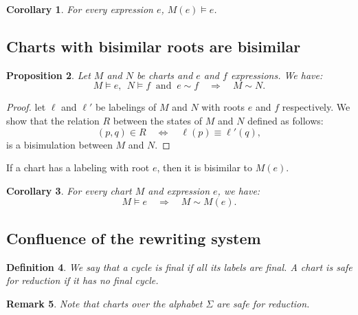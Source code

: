 \documentclass{article}
\newtheorem{definition}{Definition}[section]
\newtheorem{proposition}[definition]{Proposition}
\newtheorem{corollary}[definition]{Corollary}
\newtheorem{remark}[definition]{Remark}
\begin{document}
\begin{corollary} For every expression $e$, $M(e)\models e$.~\label{prop:milner-chart-is-decorable}
~\label{prop:Milner-is-decorable}\end{corollary}

\subsection{Charts with bisimilar roots are bisimilar}

\begin{proposition} Let $M$ and $N$ be charts and $e$ and $f$ expressions. We have:
  $$ M\models e,\ \ N\models f \ \text{ and }\ e\sim f \quad \Longrightarrow\quad M\sim N.$$
\end{proposition}
\begin{proof} let $\ell$ and $\ell'$ be labelings of $M$ and $N$ with roots $e$ and $f$ respectively.  We show that the relation $R$ between the states of $M$ and $N$ defined as follows:
  $$ (p,q)\in R \quad \Leftrightarrow \quad \ell(p) \equiv \ell'(q), $$
  is a bisimulation between $M$ and $N$.
\end{proof}
If a chart has a labeling with root $e$, then it is bisimilar to $M(e)$.
\begin{corollary} For every chart $M$ and expression $e$, we have:
  $$M\models e \quad \Longrightarrow\quad M\sim M(e).$$ 
\end{corollary}

\subsection{Confluence of the rewriting system}

  \begin{definition}
 We say that a cycle is \emph{final} if all its labels are final. A chart is \emph{safe for reduction} if it has no final cycle.
 \end{definition}

 \begin{remark} Note that charts over the alphabet $\Sigma$ are safe for reduction.
 \end{remark}
\end{document}
